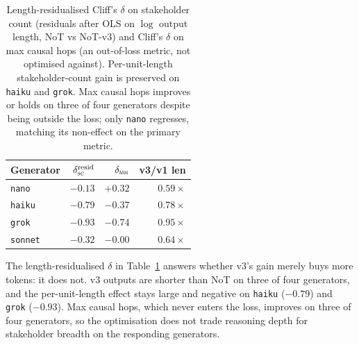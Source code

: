 \documentclass[11pt]{article}
\begin{document}
\begin{table}[t]
\centering\small
\begin{tabular}{lrrr}
\toprule
Generator & $\delta^{\text{resid}}_{\textsc{sc}}$ & $\delta_{\textsc{mh}}$ & v3/v1 len \\
\midrule
\texttt{nano}   & $-0.13$ & $+0.32$ & $0.59\times$ \\
\texttt{haiku}  & $-0.79$ & $-0.37$ & $0.78\times$ \\
\texttt{grok}   & $-0.93$ & $-0.74$ & $0.95\times$ \\
\texttt{sonnet} & $-0.32$ & $-0.00$ & $0.64\times$ \\
\bottomrule
\end{tabular}
\caption{Length-residualised Cliff's $\delta$ on stakeholder count
(residuals after OLS on $\log$ output length, NoT vs NoT-v3) and Cliff's
$\delta$ on max causal hops (an out-of-loss metric, not optimised
against). Per-unit-length stakeholder-count gain is preserved on
\texttt{haiku} and \texttt{grok}. Max causal hops improves or holds on
three of four generators despite being outside the loss; only
\texttt{nano} regresses, matching its non-effect on the primary metric.}
\label{tab:resid}
\end{table}

The length-residualised $\delta$ in Table~\ref{tab:resid} answers
whether v3's gain merely buys more tokens: it does not. v3 outputs are
shorter than NoT on three of four generators, and the per-unit-length
effect stays large and negative on \texttt{haiku} ($-0.79$) and
\texttt{grok} ($-0.93$). Max causal hops, which never enters the loss,
improves on three of four generators, so the optimisation does not trade
reasoning depth for stakeholder breadth on the responding generators.
\end{document}
